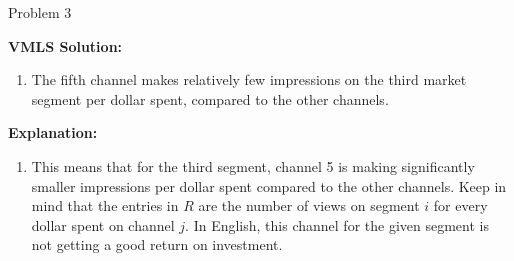\begin{problem}{Problem 3}
\begin{highlight}
        \noindent \textbf{VMLS Solution:}

        \begin{enumerate}[label = (\alph*), start = 5]
            \item The fifth channel makes relatively few impressions on the third market segment per dollar spent, compared to the other channels.
        \end{enumerate}

        \noindent \textbf{Explanation:}

        \begin{enumerate}[label = (\alph*), start = 5]
            \item This means that for the third segment, channel 5 is making significantly smaller impressions per dollar spent compared to the other channels. Keep in mind that the entries in $R$ are
            the number of views on segment $i$ for every dollar spent on channel $j$. In English, this channel for the given segment is not getting a good return on investment.
        \end{enumerate}
    \end{highlight}
\end{problem}


